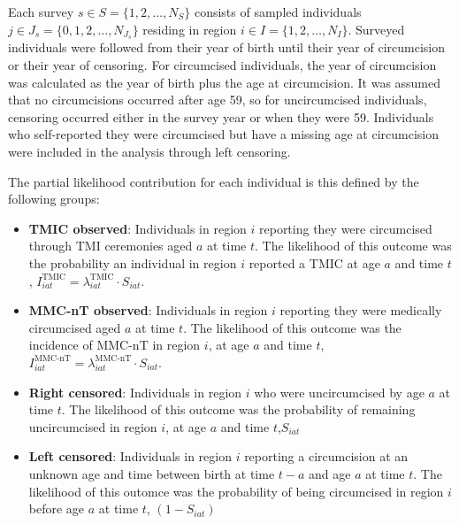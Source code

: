 \documentclass{article}
\begin{document}
\begin{appendix}
\noindent Each survey  $s \in S = \{1, 2, \ldots, N_S\}$ consists of sampled individuals $j \in J_s = \{0, 1, 2, \ldots, N_{J_s}\}$ residing in region $i \in I = \{1, 2, \ldots, N_I\}$. Surveyed individuals were followed from their year of birth until their year of circumcision or their year of censoring. For circumcised individuals, the year of circumcision was calculated as the year of birth plus the age at circumcision. It was assumed that no circumcisions occurred after age 59, so for uncircumcised individuals, censoring occurred either in the survey year or when they were 59. Individuals who self-reported they were circumcised but have a missing age at circumcision were included in the analysis through left censoring. 

\noindent The partial likelihood contribution for each individual is this defined by the following groups:
\begin{itemize}
	\item \textbf{TMIC observed}: Individuals in region $i$ reporting they were circumcised through TMI ceremonies aged $a$ at time $t$. The likelihood of this outcome was the probability an individual in region $i$ reported a TMIC at age $a$ and time $t$, $I^{\text{TMIC}}_{iat} = \lambda^{\text{TMIC}}_{iat}\cdot S_{iat}$. 
	\item \textbf{MMC-nT observed}: Individuals in region $i$ reporting they were medically circumcised aged $a$ at time $t$. The likelihood of this outcome was the incidence of MMC-nT in region $i$, at age $a$ and time $t$, $I^{\text{MMC-nT}}_{iat} = \lambda^{\text{MMC-nT}}_{iat}\cdot S_{iat}$. 
	\item \textbf{Right censored}: Individuals in region $i$ who were uncircumcised by age $a$ at time $t$.  The likelihood of this outcome was the probability of remaining uncircumcised in region $i$, at age $a$ and time $t$,$S_{iat}$
	\item \textbf{Left censored}: Individuals in region $i$ reporting a circumcision at an unknown age and time between birth at time $t-a$ and age $a$ at time $t$. The likelihood of this outomce was the probability of being circumcised in region $i$ before age $a$ at time $t$, $(1-S_{iat})$ 
\end{itemize}


\end{appendix}
\end{document}
